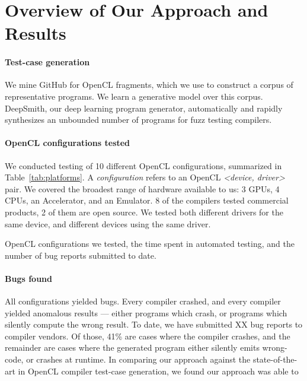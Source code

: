 \section{Overview of Our Approach and Results}\label{sec:overview}

\paragraph{Test-case generation} We mine GitHub for OpenCL fragments, which we use to construct a corpus of representative programs. We learn a generative model over this corpus. DeepSmith, our deep learning program generator, automatically and rapidly synthesizes an unbounded number of programs for fuzz testing compilers.

\paragraph{OpenCL configurations tested} We conducted testing of 10 different OpenCL configurations, summarized in Table~\ref{tab:platforms}. A \emph{configuration} refers to an OpenCL \emph{<device, driver>} pair. We covered the broadest range of hardware available to us: 3 GPUs, 4 CPUs, an Accelerator, and an Emulator. 8 of the compilers tested commercial products, 2 of them are open source. We tested both different drivers for the same device, and different devices using the same driver.


\begin{table*}[t!]
	\scriptsize %
	\centering %
	
	\caption{OpenCL configurations we tested, the time spent in automated testing, and the number of bug reports submitted to date.}
	\label{tab:platforms}
\end{table*}


\paragraph{Bugs found} All configurations yielded bugs. Every compiler crashed, and every compiler yielded anomalous results --- either programs which crash, or programs which silently compute the wrong result. To date, we have submitted XX bug reports to compiler vendors. Of those, 41\% are cases where the compiler crashes, and the remainder are cases where the generated program either silently emits wrong-code, or crashes at runtime. In comparing our approach against the state-of-the-art in OpenCL compiler test-case generation, we found our approach was able to \cc{\ldots}